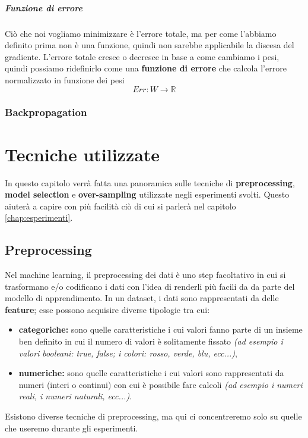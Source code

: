 \documentclass[12pt, twoside, letterpaper]{report}
\begin{document}
				 
				 \paragraph{Funzione di errore} Ciò che noi vogliamo minimizzare è l'errore totale, ma per come l'abbiamo definito prima non è una funzione, quindi non sarebbe applicabile la discesa del gradiente. L'errore totale cresce o decresce in base a come cambiamo i pesi, quindi possiamo ridefinirlo come una \textbf{funzione di errore} che calcola l'errore normalizzato in funzione dei pesi $$Err : W \rightarrow \mathbb{R}$$ 
			\subsection{Backpropagation}
				
				
	\chapter{Tecniche utilizzate}
		In questo capitolo verrà fatta una panoramica sulle tecniche di \textbf{preprocessing}, \textbf{model selection} e \textbf{over-sampling} utilizzate negli esperimenti svolti. Questo aiuterà a capire con più facilità ciò di cui si parlerà nel capitolo \ref{chap:esperimenti}.
		\section{Preprocessing}
			Nel machine learning, il preprocessing dei dati è uno step facoltativo in cui si trasformano e/o codificano i dati con l'idea di renderli più facili da  da parte del modello di apprendimento. In un dataset, i dati sono rappresentati da delle \textbf{feature}; esse possono acquisire diverse tipologie tra cui: 
			
			\begin{itemize}
				\item \textbf{categoriche:} sono quelle caratteristiche i cui valori fanno parte di un insieme ben definito in cui il numero di valori è solitamente fissato \textit{(ad esempio i valori booleani: true, false; i colori: rosso, verde, blu, ecc...)},
				\item \textbf{numeriche:} sono quelle caratteristiche i cui valori sono rappresentati da numeri (interi o continui) con cui è possibile fare calcoli \textit{(ad esempio i numeri reali, i numeri naturali, ecc...)}.
			\end{itemize}
			Esistono diverse tecniche di preprocessing, ma qui ci concentreremo solo su quelle che useremo durante gli esperimenti.
			
\end{document}
